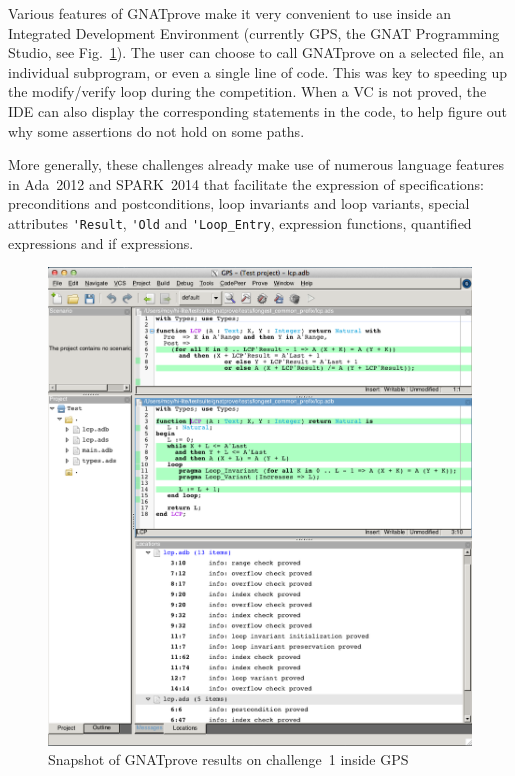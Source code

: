 \documentclass[sttt,final]{svjour}
\newcommand{\gnatprove}{GNATprove\xspace}
\newcommand{\newspark}{SPARK~2014\xspace}
\newcommand{\adatwtw}{Ada~2012\xspace}
\begin{document}
Various features of \gnatprove make it very convenient to use inside
an Integrated Development Environment (currently GPS, the GNAT
Programming Studio, see Fig.~\ref{fig:snapshot}). The user can choose
to call \gnatprove on a selected file, an individual subprogram, or
even a single line of code. This was key to speeding up the
modify/verify loop during the competition. When a VC is not proved,
the IDE can also display the corresponding statements in the code, to
help figure out why some assertions do not hold on some paths.

More generally, these challenges already make use of numerous
language features in \adatwtw and \newspark that facilitate the
expression of specifications: preconditions and postconditions, loop
invariants and loop variants, special attributes \verb|'Result|,
\verb|'Old| and \verb|'Loop_Entry|, expression functions, quantified
expressions and if expressions.

\begin{figure}
\includegraphics[width=\linewidth]{gnatprove.png}
\caption{Snapshot of GNATprove results on challenge~1 inside GPS}
\label{fig:snapshot}
\end{figure}
\end{document}
